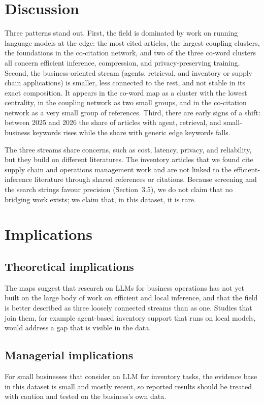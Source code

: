 \section{Discussion}

Three patterns stand out. First, the field is dominated by work on running language models at the edge: the most cited articles, the largest coupling clusters, the foundations in the co-citation network, and two of the three co-word clusters all concern efficient inference, compression, and privacy-preserving training. Second, the business-oriented stream (agents, retrieval, and inventory or supply chain applications) is smaller, less connected to the rest, and not stable in its exact composition. It appears in the co-word map as a cluster with the lowest centrality, in the coupling network as two small groups, and in the co-citation network as a very small group of references. Third, there are early signs of a shift: between 2025 and 2026 the share of articles with agent, retrieval, and small-business keywords rises while the share with generic edge keywords falls.

The three streams share concerns, such as cost, latency, privacy, and reliability, but they build on different literatures. The inventory articles that we found cite supply chain and operations management work and are not linked to the efficient-inference literature through shared references or citations. Because screening and the search strings favour precision (Section~3.5), we do not claim that no bridging work exists; we claim that, in this dataset, it is rare. 

\section{Implications}

\subsection{Theoretical implications}
The maps suggest that research on LLMs for business operations has not yet built on the large body of work on efficient and local inference, and that the field is better described as three loosely connected streams than as one. Studies that join them, for example agent-based inventory support that runs on local models, would address a gap that is visible in the data. 

\subsection{Managerial implications}
For small businesses that consider an LLM for inventory tasks, the evidence base in this dataset is small and mostly recent, so reported results should be treated with caution and tested on the business's own data. 
